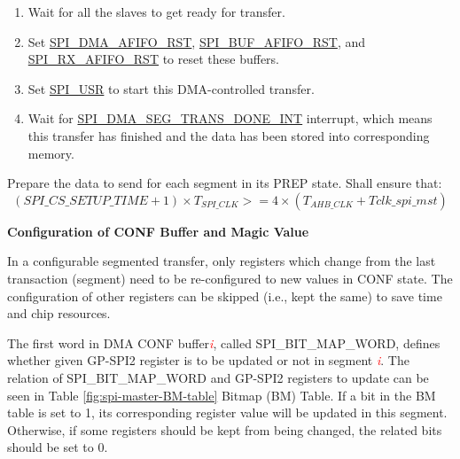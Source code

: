 \documentclass[main\_\_EN.tex]{subfiles}
\begin{document}
\begin{enumerate}
   \item Wait for all the slaves to get ready for transfer.

    \item Set \hyperref[fielddesc:SPIDMAAFIFORST]{SPI\_DMA\_AFIFO\_RST}, \hyperref[fielddesc:SPIBUFAFIFORST]{SPI\_BUF\_AFIFO\_RST}, and \hyperref[fielddesc:SPIRXAFIFORST]{SPI\_RX\_AFIFO\_RST} to reset these buffers.

   \item Set \hyperref[fielddesc:SPIUSR]{SPI\_USR} to start this DMA-controlled transfer.

   \item Wait for \hyperref[int:SPIDMASEGTRANSDONEINT]{SPI\_DMA\_SEG\_TRANS\_DONE\_INT} interrupt, which means this transfer has finished and the data has been stored into corresponding memory.
 \end{enumerate}

\begin{tiplisting}
\vspace{-2em}
Prepare the data to send for each segment in its PREP state. Shall ensure that:
\vspace{1em}
    \[
    (\hyperref[fielddesc:SPICSSETUPTIME]{SPI\_CS\_SETUP\_TIME} + 1) \times T_{SPI\_CLK} >= 4 \times (T_{AHB\_CLK} + Tclk\_spi\_mst)
    \]
\end{tiplisting}

\textbf{Configuration of CONF Buffer and Magic Value}\label{sec:SCT-CONF-Buffer}

In a configurable segmented transfer, only registers which change from the last transaction (segment) need to be re-configured to new values in CONF state. The configuration of other registers can be skipped (i.e., kept the same) to save time and chip resources.

The first word in DMA CONF buffer\textcolor{red}{\it i}, called SPI\_BIT\_MAP\_WORD, defines whether given GP-SPI2 register is to be updated or not in segment \textcolor{red}{\it i}. The relation of SPI\_BIT\_MAP\_WORD and GP-SPI2 registers to update can be seen in Table \ref{fig:spi-master-BM-table} Bitmap (BM) Table. If a bit in the BM table is set to 1, its corresponding register value will be updated in this segment. Otherwise, if some registers should be kept from being changed, the related bits should be set to 0.
\end{document}
